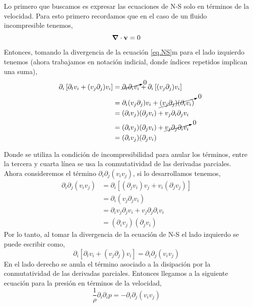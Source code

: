 \documentclass[executivepaper,12pt]{article}
\numberwithin{equation}{section}
\begin{document}
Lo primero que buscamos es expresar las ecuaciones de N-S solo en términos de la velocidad. Para esto primero recordamos que en el caso de un fluido incompresible tenemos,
\begin{equation*}
	\vb{\grad{}}\cdot\vb{v}=0
\end{equation*}
Entonces, tomando la divergencia de la ecuación \ref{eq.NS}m para el lado izquierdo tenemos (ahora trabajamos en notación indicial, donde índices repetidos implican una suma),
\begin{align*}
	\partial_i \left[\partial_t v_i+(v_j\partial_j)v_i\right]&=\cancelto{0}{\partial_t \partial_i v_i}+\partial_i\left[(v_j\partial_j)v_i\right]\\
	&=\partial_i(v_j\partial_j)v_i+\cancelto{0}{(v_j\partial_j)(\partial_iv_i)}\\
	&=(\partial_iv_j)(\partial_j v_i)+v_j\partial_i\partial_jv_i\\
	&=(\partial_iv_j)(\partial_j v_i)+\cancelto{0}{v_j\partial_j \partial_iv_i}\\
	&=(\partial_i v_j)(\partial_j v_i)
\end{align*}

Donde se utiliza la condición de incompresibilidad para anular los términos, entre la tercera y cuarta línea se usa la conmutatividad de las derivadas parciales. Ahora consideremos el término $\partial_i\partial_j(v_iv_j)$, si lo desarrollamos tenemos,
\begin{align*}
	\partial_i\partial_j(v_iv_j)&=\partial_i \left[(\partial_j v_i)v_j+v_i(\partial_j v_j)\right]\\
	&=\partial_i(v_j \partial_j v_i)\\
	&=\partial_i v_j \partial_j v_i + v_j \partial _j \partial_i v_i\\
	&=(\partial_i v_j)(\partial_j v_i)
\end{align*}
Por lo tanto, al tomar la divergencia de la ecuación de N-S el lado izquierdo se puede escribir como,
\begin{equation*}
		\partial_i \left[\partial_t v_i+(v_j\partial_j)v_i\right]=\partial_i\partial_j (v_iv_j)
\end{equation*}
En el lado derecho se anula el término asociado a la disipación por la conmutatividad de las derivadas parciales. Entonces llegamos a la siguiente ecuación para la presión en términos de la velocidad,
\begin{equation}
	\frac{1}{\rho}\partial_i\partial_i p=-\partial_i\partial_j (v_iv_j) \label{eq.Pres}
\end{equation}
\end{document}
